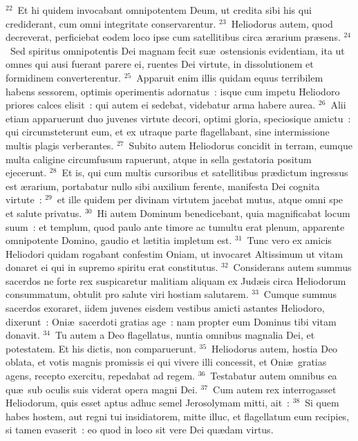 ${}^{22}$~Et hi quidem invocabant omnipotentem Deum, ut credita sibi his qui crediderant, cum omni integritate conservarentur.
${}^{23}$~Heliodorus autem, quod decreverat, perficiebat eodem loco ipse cum satellitibus circa \ae rarium pr\ae sens.
${}^{24}$~Sed spiritus omnipotentis Dei magnam fecit su\ae\ ostensionis evidentiam, ita ut omnes qui ausi fuerant parere ei, ruentes Dei virtute, in dissolutionem et formidinem converterentur.
${}^{25}$~Apparuit enim illis quidam equus terribilem habens sessorem, optimis operimentis adornatus~: isque cum impetu Heliodoro priores calces elisit~: qui autem ei sedebat, videbatur arma habere aurea.
${}^{26}$~Alii etiam apparuerunt duo juvenes virtute decori, optimi gloria, speciosique amictu~: qui circumsteterunt eum, et ex utraque parte flagellabant, sine intermissione multis plagis verberantes.
${}^{27}$~Subito autem Heliodorus concidit in terram, eumque multa caligine circumfusum rapuerunt, atque in sella gestatoria positum ejecerunt.
${}^{28}$~Et is, qui cum multis cursoribus et satellitibus pr\ae dictum ingressus est \ae rarium, portabatur nullo sibi auxilium ferente, manifesta Dei cognita virtute~:
${}^{29}$~et ille quidem per divinam virtutem jacebat mutus, atque omni spe et salute privatus.
${}^{30}$~Hi autem Dominum benedicebant, quia magnificabat locum suum~: et templum, quod paulo ante timore ac tumultu erat plenum, apparente omnipotente Domino, gaudio et l\ae titia impletum est.
${}^{31}$~Tunc vero ex amicis Heliodori quidam rogabant confestim Oniam, ut invocaret Altissimum ut vitam donaret ei qui in supremo spiritu erat constitutus.
${}^{32}$~Considerans autem summus sacerdos ne forte rex suspicaretur malitiam aliquam ex Jud\ae is circa Heliodorum consummatum, obtulit pro salute viri hostiam salutarem.
${}^{33}$~Cumque summus sacerdos exoraret, iidem juvenes eisdem vestibus amicti astantes Heliodoro, dixerunt~: Oni\ae\ sacerdoti gratias age~: nam propter eum Dominus tibi vitam donavit.
${}^{34}$~Tu autem a Deo flagellatus, nuntia omnibus magnalia Dei, et potestatem. Et his dictis, non comparuerunt.
${}^{35}$~Heliodorus autem, hostia Deo oblata, et votis magnis promissis ei qui vivere illi concessit, et Oni\ae\ gratias agens, recepto exercitu, repedabat ad regem.
${}^{36}$~Testabatur autem omnibus ea qu\ae\ sub oculis suis viderat opera magni Dei.
${}^{37}$~Cum autem rex interrogasset Heliodorum, quis esset aptus adhuc semel Jerosolymam mitti, ait~:
${}^{38}$~Si quem habes hostem, aut regni tui insidiatorem, mitte illuc, et flagellatum eum recipies, si tamen evaserit~: eo quod in loco sit vere Dei qu\ae dam virtus.
